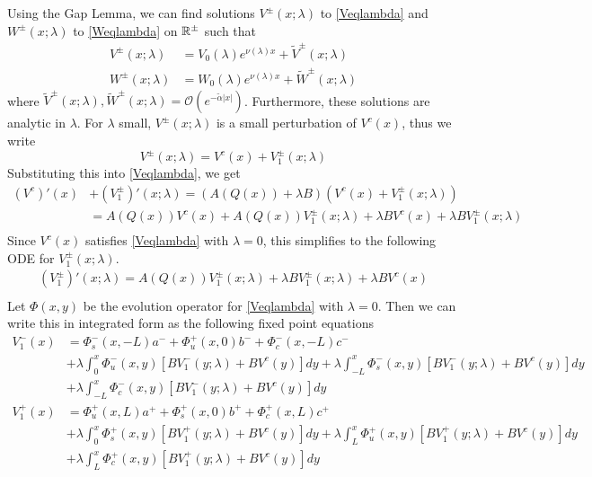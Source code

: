 \documentclass[thesis.tex]{subfiles}
\begin{document}
Using the Gap Lemma, we can find solutions $V^\pm(x; \lambda)$ to \eqref{Veqlambda} and $W^\pm(x; \lambda)$ to \eqref{Weqlambda} on ${\mathbb R}^\pm$ such that
\begin{align*}
V^\pm(x; \lambda) &= V_0(\lambda)e^{\nu(\lambda)x} + \tilde{V}^\pm(x; \lambda) \\
W^\pm(x; \lambda) &= W_0(\lambda)e^{\nu(\lambda)x} + \tilde{W}^\pm(x; \lambda)
\end{align*}
where $\tilde{V}^\pm(x; \lambda), \tilde{W}^\pm(x; \lambda) = \mathcal{O}(e^{-\tilde{\alpha}|x|})$. Furthermore, these solutions are analytic in $\lambda$. For $\lambda$ small, $V^\pm(x; \lambda)$ is a small perturbation of $V^c(x)$, thus we write 
\[
V^\pm(x; \lambda) = V^c(x) + V_1^\pm(x; \lambda)
\]
Substituting this into \eqref{Veqlambda}, we get
\begin{align*}
(V^c)'(x) &+ (V_1^\pm)'(x; \lambda)
= (A(Q(x)) + \lambda B)(V^c(x) + V_1^\pm(x; \lambda)) \\
&= A (Q(x))V^c(x) + A(Q(x))V_1^\pm(x; \lambda) + \lambda B V^c(x) + \lambda B V_1^\pm(x; \lambda) \\
\end{align*}
Since $V^c(x)$ satisfies \eqref{Veqlambda} with $\lambda = 0$, this simplifies to the following ODE for $V_1^\pm(x; \lambda)$.
\begin{align*}
(V_1^\pm)'(x; \lambda)
= A(Q(x))V_1^\pm(x; \lambda) + \lambda B V_1^\pm(x; \lambda) + \lambda B V^c(x) \\
\end{align*}
Let $\Phi(x,y)$ be the evolution operator for \eqref{Veqlambda} with $\lambda = 0$. Then we can write this in integrated form as the following fixed point equations
\begin{equation*}
\begin{aligned}
V_1^-(x) &= \Phi_s^-(x, -L) a^- + \Phi_u^+(x, 0) b^- + \Phi_c^-(x, -L) c^- \\
&+ \lambda \int_0^x \Phi_u^-(x, y) [B V_1^-(y; \lambda) + B V^c(y)] dy + \lambda \int_{-L}^x \Phi_s^-(x, y)[B V_1^-(y; \lambda) + B V^c(y)] dy \\
&+ \lambda \int_{-L}^x \Phi_c^-(x, y) [B V_1^-(y; \lambda) + B V^c(y)] dy \\ 
V_1^+(x) &= \Phi_u^+(x, L) a^+ + \Phi_s^+(x, 0) b^+ + \Phi_c^+(x, L)c^+ \\
&+ \lambda \int_0^x \Phi_s^+(x, y)[B V_1^+(y; \lambda) + B V^c(y)] dy
+ \lambda \int_{L}^x \Phi_u^+(x, y)[B V_1^+(y; \lambda) + B V^c(y)] dy \\
&+ \lambda \int_{L}^x \Phi_c^+(x, y)[B V_1^+(y; \lambda) + B V^c(y)] dy
\end{aligned}
\end{equation*}
\end{document}
